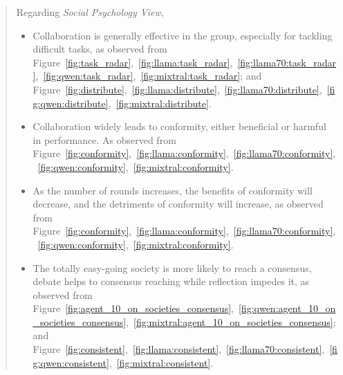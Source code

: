 \documentclass[11pt]{article}
\begin{document}
\begin{abstract}
Regarding \textit{Social Psychology View}, 
\begin{itemize}
    \item Collaboration is generally effective in the group, especially for tackling difficult tasks, as observed from Figure~\ref{fig:task_radar},~\ref{fig:llama:task_radar},~\ref{fig:llama70:task_radar},~\ref{fig:qwen:task_radar},~\ref{fig:mixtral:task_radar}; and Figure~\ref{fig:distribute},~\ref{fig:llama:distribute},~\ref{fig:llama70:distribute},~\ref{fig:qwen:distribute},~\ref{fig:mixtral:distribute}. 

    \item Collaboration widely leads to conformity, either beneficial or harmful in performance. As observed from Figure~\ref{fig:conformity},~\ref{fig:llama:conformity},~\ref{fig:llama70:conformity},~\ref{fig:qwen:conformity},~\ref{fig:mixtral:conformity}. 

    \item As the number of rounds increases, the benefits of conformity will decrease, and the detriments of conformity will increase, as observed from Figure~\ref{fig:conformity},~\ref{fig:llama:conformity},~\ref{fig:llama70:conformity},~\ref{fig:qwen:conformity},~\ref{fig:mixtral:conformity}. 

    \item The totally easy-going society is more likely to reach a consensus, debate helps to consensus reaching while reflection impedes it, as observed from Figure~\ref{fig:agent_10_on_societies_consensus},~\ref{fig:qwen:agent_10_on_societies_consensus},~\ref{fig:mixtral:agent_10_on_societies_consensus}; and Figure~\ref{fig:consistent},~\ref{fig:llama:consistent},~\ref{fig:llama70:consistent},~\ref{fig:qwen:consistent},~\ref{fig:mixtral:consistent}. 
\end{itemize}


	
    

\end{abstract}
\end{document}
